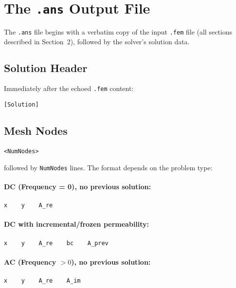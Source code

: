 \documentclass[11pt]{article}
\begin{document}
\section{The \texttt{.ans} Output File}

The \texttt{.ans} file begins with a verbatim copy of the input
\texttt{.fem} file (all sections described in Section~2), followed by
the solver's solution data.

\subsection{Solution Header}

Immediately after the echoed \texttt{.fem} content:

\begin{lstlisting}
[Solution]
\end{lstlisting}

\subsection{Mesh Nodes}

\begin{lstlisting}
<NumNodes>
\end{lstlisting}

followed by \texttt{NumNodes} lines.  The format depends on the problem
type:

\paragraph{DC (Frequency = 0), no previous solution:}
\begin{lstlisting}
x    y    A_re
\end{lstlisting}

\paragraph{DC with incremental/frozen permeability:}
\begin{lstlisting}
x    y    A_re    bc    A_prev
\end{lstlisting}

\paragraph{AC (Frequency $> 0$), no previous solution:}
\begin{lstlisting}
x    y    A_re    A_im
\end{lstlisting}
\end{document}
